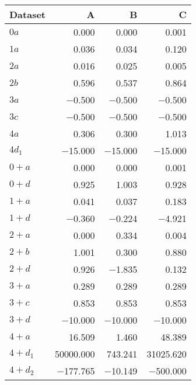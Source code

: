 \begin{tabular}{lrrr}
\toprule
 Dataset   &         A &       B &         C \\
\midrule
 $0 a$     &     \num{0.000} &   \num{0.000} &     \num{0.001} \\
 $1 a$     &     \num{0.036} &   \num{0.034} &     \num{0.120} \\
 $2 a$     &     \num{0.016} &   \num{0.025} &     \num{0.005} \\
 $2 b$     &     \num{0.596} &   \num{0.537} &     \num{0.864} \\
 $3 a$     &    \num{-0.500} &  \num{-0.500} &    \num{-0.500} \\
 $3 c$     &    \num{-0.500} &  \num{-0.500} &    \num{-0.500} \\
 $4 a$     &     \num{0.306} &   \num{0.300} &     \num{1.013} \\
 $4 d_1$   &   \num{-15.000} & \num{-15.000} &   \num{-15.000} \\
 $0+ a$    &     \num{0.000} &   \num{0.000} &     \num{0.001} \\
 $0+ d$    &     \num{0.925} &   \num{1.003} &     \num{0.928} \\
 $1+ a$    &     \num{0.041} &   \num{0.037} &     \num{0.183} \\
 $1+ d$    &    \num{-0.360} &  \num{-0.224} &    \num{-4.921} \\
 $2+ a$    &     \num{0.000} &   \num{0.334} &     \num{0.004} \\
 $2+ b$    &     \num{1.001} &   \num{0.300} &     \num{0.880} \\
 $2+ d$    &     \num{0.926} &  \num{-1.835} &     \num{0.132} \\
 $3+ a$    &     \num{0.289} &   \num{0.289} &     \num{0.289} \\
 $3+ c$    &     \num{0.853} &   \num{0.853} &     \num{0.853} \\
 $3+ d$    &   \num{-10.000} & \num{-10.000} &   \num{-10.000} \\
 $4+ a$    &    \num{16.509} &   \num{1.460} &    \num{48.389} \\
 $4+ d_1$  & \num{50000.000} & \num{743.241} & \num{31025.620} \\
 $4+ d_2$  &  \num{-177.765} & \num{-10.149} &  \num{-500.000} \\
\bottomrule
\end{tabular}